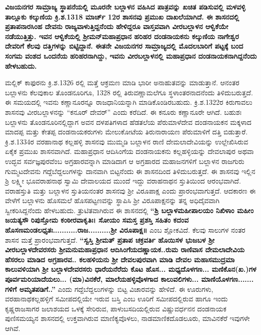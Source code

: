 \textbf{ವಿಜಯನಗರ ಸಾಮ್ರಾಜ್ಯ ಸ್ಥಾಪನೆಯಲ್ಲಿ ಮೂರನೇ ಬಲ್ಲಾಳನ ವಹಿಸಿದ ಪಾತ್ರವನ್ನು ಖಚಿತ ಪಡಿಸುವಲ್ಲಿ ಮಳವಳ್ಳಿ ತಾಲ್ಲೂಕು ಕಲ್ಕುಣಿಯ ಕ್ರಿ.ಶ.1318 ಮಾರ್ಚ್ 12ರ ಶಾಸನವು ಪ್ರಮುಖ ದಾಖಲೆಯಾಗಿದೆ. ಈ ಶಾಸನದಲ್ಲಿ ಪ್ರತಾಪನಾರಸಿಂಹ ದೇವನು ರಾಜ್ಯವಾಳುತ್ತಿದ್ದನೆಂದು ಹೇಳಿದ್ದರೂ ವಾಸ್ತವವಾಗಿ ವೀರಬಲ್ಲಾಳನ ಆಳ್ವಿಕೆಯೇ ನಡೆಯುತ್ತಿತ್ತು. ಇವನ ಆಳ್ವಿಕೆಯಲ್ಲಿ ಶ‍್ರೀಮನ್​ಮಹಾಪ್ರಧಾನ ಹರಿಹರ ದಂಡನಾಯಕನು ಕಲ್ಕುಣಿಯ ನಾಗೇಶ್ವರ ದೇವರಿಗೆ ಕೆಲವು ದತ್ತಿಗಳನ್ನು ಬಿಟ್ಟಿದ್ದಾನೆ. ಈತನೇ ವಿಜಯನಗರ ಸಾಮ್ರಾಜ್ಯದಲ್ಲಿ ಮೊದಲಬಾರಿಗೆ ಪಟ್ಟಕ್ಕೆ ಬಂದ ಸಂಗಮ ವಂಶದ ಒಂದನೆಯ ಹರಿಹರನಾಗಿದ್ದು, ಇವನು ವೀರಬಲ್ಲಾಳನಲ್ಲಿ ಮಹಾಪ್ರಧಾನ ದಂಡನಾಯಕನಾಗಿದ್ದನೆಂದು ಹೇಳಬಹುದು.}

ಮಲ್ಲಿಕ್​ ಕಾಫುರನು ಕ್ರಿ.ಶ.1326 ರಲ್ಲಿ ಮತ್ತೆ ಆಕ್ರಮಣ ಮಾಡಿ ಭಾರೀ ಅನಾಹುತವನ್ನು ಮಾಡುತ್ತಾನೆ. ಆನಂತರ ಬಲ್ಲಾಳನು ಕೆಲವುಕಾಲ ತೊಂಡನೂರಿಗೂ, 1328 ರಲ್ಲಿ ತಿರುವಣ್ಣಾಮಲೆಗೂ ಸ್ಥಳಾಂತರನಾದನೆಂದು ತಿಳಿದುಬರುತ್ತದೆ. ಈ ಸಮಯದಲ್ಲಿ ಇವನು ಕಣ್ಣಾನೂರನ್ನೂ ರಾಜಧಾನಿಯನ್ನಾಗಿ ಮಾಡಿಕೊಂಡಿರಬಹುದು. ಕ್ರಿ.ಶ.1322ರ ಕಿರುಗಾವಲು ಶಾಸನವು ವೀರಬಲ್ಲಾಳನನ್ನು “ಕನೂರ್​ ದೇವರ್​” ಎಂದು ಕರೆದಿದೆ. ಈ ಕನೂರು ಕಣ್ಣಾನೂರೇ ಆಗಿದೆ. ಬಹುಶಃ ಬಲ್ಲಾಳನು ತೊಂಡನೂರಿನಲ್ಲಿದ್ದಾಗ ಅವನ ದಳಪತಿಗಳಾದ ಹೆಡತಲೆಯ ಪೆರುಮಾಳೆದೇವ ದಂಡನಾಯಕನ ಮಕ್ಕಳಾದ ಮಾದಪ್ಪ ಮತ್ತು ಕೇತಪ್ಪ ದಂಡನಾಯಕರುಗಳು ಮೇಲುಕೋಟೆಯ ತಿರುನಾರಾಯಣ ಪೆರುಮಾಳಿಗೆ ದತ್ತಿ ಬಿಡುತ್ತಾರೆ. ಕ್ರಿ.ಶ.1334ರ ವರಹಾನಾಥ ಕಲ್ಲಹಳ್ಳಿ ಶಾಸನವು ಮುಮ್ಮಡಿ ಬಲ್ಲಾಳನ ರಾಣಿ ದೇಮಲಾದೇವಿಯನ್ನು ಉಲ್ಲೇಖಿಸಿರುವ ಏಕೈಕ ಪ್ರಮುಖ ಶಾಸನವಾಗಿದೆ. ಮಹಾಪ್ರಧಾನ ಆದಿಸಿಂಗೆಯ ದಂಡನಾಯಕನು ಕಲ್ಲಹಳ್ಳಿಯನ್ನು ದೇವಲಾಪುರ ಅಥವಾ ಉದ್ಭವ ಸರ್ವಜ್ಞಪುರವೆಂಬ ಅಗ್ರಹಾರವನ್ನಾಗಿ ಮಾಡಿದಾಗ ಆ ಅಗ್ರಹಾರದ ಮಹಾಜನಗಳಿಗೆ ಬಲ್ಲಾಳನ ರಾಜಗುರು ಗುಮ್ಮಟದೇವನು ಗದ್ದೆಬೆದ್ದಲುಗಳನ್ನು ದಾನವಾಗಿ ಬಿಟ್ಟನೆಂದು ಈ ಶಾಸನದಿಂದ ತಿಳಿದುಬರುತ್ತದೆ. ಈ ಶಾಸನವು ಇಲ್ಲಿನ ಶ್ರಿ ಲಕ್ಷ್ಮೀ ಭೂವರಾಹನಾಥ ಸ್ವಾಮಿ ದೇವಾಲಯದ ಮುಂದೆ ಇದ್ದು ವರಾಹನಾಥನ ಸ್ತುತಿಯಿಂದ ಆರಂಭವಾಗಿದೆ. ವರಾಹಸ್ತುತಿ ಮತ್ತು ಬಲ್ಲಾಳನ ಸ್ತುತಿಯನಂತರ ಶಾಸನವು ಶ‍್ರೀ ವಿರೂಪಾಕ್ಷ ಎಂದು ಪ್ರಾರಂಭವಾಗುತ್ತದೆ. ಆದಕಾರಣ ಈ ವೇಳೆಗೆ ಬಲ್ಲಾಳನು ಹೊಸಮಲೆ ಹೊಸಪಟ್ಟಣವನ್ನು ಸ್ಥಾಪಿಸಿ ಶ‍್ರೀ ವಿರೂಪಾಕ್ಷನನ್ನು ತನ್ನ ಅಧಿದೈವವಾಗಿ ಸ್ವೀಕರಿಸಿದ್ದನೆಂದು ಹೇಳಬಹುದು. ತ್ರುಟಿತವಾಗಿರುವ ಈ ಶಾಸನದಲ್ಲಿ \textbf{“ಶ್ರಿ ಬಲ್ಲಾಳಮಹೀಪಾಲಯಂ ನಿಖಿಳಾಂ ಮಹೀಂ ಜಯತ್ಯಸೌ ರಿಪುಸ್ತೋಮ ಕಂಠೀರವಾಕೃತಿಃ। ಸೋಯಂ ಸಮಸ್ತ ಪ್ರಶಸ್ತಿ ಸಹಿತಂ ಕದಂವ ಹೊಸಣಮಂಡಲಧೃತಃ...........ರಾಜ..........ಶ‍್ರೀ ವಿರೂಪಾಕ್ಷ॥} ಎಂಬ ಶ್ಲೋಕವಿದೆ. ಕೆಲವು ಸಾಲುಗಳ ನಂತರ ಶಾಸನ ಮತ್ತೆ ಪ್ರಾರಂಭವಾಗುತ್ತದೆ. \textbf{“ಸ್ವಸ್ತಿ ಶ‍್ರೀಮತ್​ ಪ್ರತಾಪ ಚಕ್ರವರ್ತಿ ಹೊಯಿಸಳ ಭುಜಬಳ ಶ‍್ರೀ ವೀರಬಲ್ಲಾಳದೇವರಸರು ಶ‍್ರೀಮನುಮಹಾಪ್ರಧಾನ ಆದಿಸಿಂಗೆಯದಣ್ಣಾಯಕ..ರುಮ ರಾಣಿವಾಸ ದೇಮಲಾದೇವಿಯ ಹೆಸರಲು ಮಾಡಿದ ಅಗ್ರಹಾರವ.. ಕಲಹಳಿಯನು ಶ‍್ರೀ ದೇವಲಪುರವಾಗಿ ಮಾಡಿ ದೇವಲ ಮಹಾಸಮುದ್ರಮಾ ಕಾಲುವಳಿಯಾಗಿ ಶ‍್ರೀ ಬಲ್ಲಾಳದೇವರಸರು ಧಾರೆಯನೆರೆದು ಕೊಟ ಹೊಸ... ಮಧ್ಯದೊಳಗಣ... ಮಣಿಕೊನ(ಖ.)ಗಳ ಪೂರ್ವಮರಿಯಾದೆಯಲು... (ಮಾ)ವಿನಕೆರೆ, ಮಾಲೆಯಹಳ್ಳಿವೊಳಗಾದ ಕಾಲುವಲಿಗಳು... ಮಾಣಿಯೊಳಗಣ....... ಗಳಿಗೆ ಅಮೃತಪಡಿಗೆ..”} ಎಂದು ಗದ್ದೆಬೆದ್ದಲುಗಳನ್ನು ಬಿಟ್ಟ ವಿಚಾರವನ್ನು ಹೇಳಿದೆ. ಈ ಊರುಗಳು, ವರಹಾನಾಥಕಲ್ಲಹಳ್ಳಿಗೆ ಸಮೀಪದಲ್ಲಿಯೇ ಇರುವ ಬಸ್ತಿ ಎಂಬ ಊರಿಗೆ ಸಮೀಪದಲ್ಲಿರುವ ಹಾಗೂ ಇಂದು ಕೃಷ್ಣರಾಜಸಾಗರ ಜಲಾಶಯದ ಒಳಕ್ಕೆ ಸೇರಿರುವ, ಪಾಳುಬಸದಿಯಲ್ಲಿರುವ ವಿಷ್ಣುವರ್ಧನನ ದಂಡನಾಯಕ ಪುಣಿಸಮಯ್ಯನ ಶಾಸನದಲ್ಲಿ ಉಕ್ತವಾಗಿರುವ ಮಾಣಿಕ್ಯವೊಳಲು, ನಾಡಮಾಣಿಕದೊಡಲೂರು, ಮಾವಿನಕೆರೆ ಇವುಗಳೇ ಆಗಿವೆ. 

